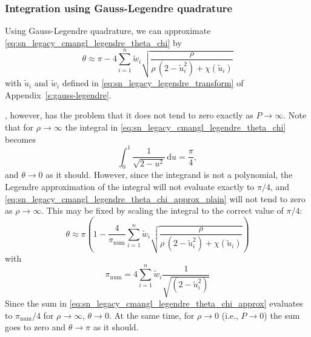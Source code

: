 \subsubsection{Integration using Gauss-Legendre quadrature}
%
Using Gauss-Legendre quadrature, we can approximate \cref{eq:sn_legacy_cmangl_legendre_theta_chi} by
%
\begin{equation}
    \label{eq:sn_legacy_cmangl_legendre_theta_chi_approx_plain}
    \theta \approx
        \pi - 4 \sum_{i=1}^n \tilde{w}_i
        \sqrt{ \frac{ \rho }{ \rho \, (2-\tilde{u}_i^2) + \chi(\tilde{u}_i) } }
\end{equation}
%
with \(\tilde{u}_i\) and \(\tilde{w}_i\) defined in \cref{eq:sn_legacy_legendre_transform} of Appendix~\ref{s:gauss-legendre}.

, however, has the problem that it does not tend to zero exactly as \(P \rightarrow \infty\).
Note that for \(\rho \rightarrow \infty\) the integral in \cref{eq:sn_legacy_cmangl_legendre_theta_chi} becomes
%
\begin{equation}
    \label{eq:sn_legacy_cmangl_legendre_pi}
    \int_0^1 \frac{ 1 }{ \sqrt{ 2-u^2 } } \, \mathrm{d}u = \frac{ \pi }{ 4 } ,
\end{equation}
%
and \(\theta \rightarrow 0\) as it should.
However, since the integrand is not a polynomial, the Legendre approximation of the integral will not evaluate exactly to \(\pi/4\), and \cref{eq:sn_legacy_cmangl_legendre_theta_chi_approx_plain} will not tend to zero as \(\rho \rightarrow \infty\).
This may be fixed by scaling the integral to the correct value of \(\pi/4\):
%
\begin{equation}
    \label{eq:sn_legacy_cmangl_legendre_theta_chi_approx}
    \theta \approx
        \pi \left( 1
        - \frac{ 4 }{ \pi_\mathrm{num} }
        \sum_{i=1}^n \tilde{w}_i \sqrt{
            \frac{ \rho
            }{ \rho \, (2-\tilde{u}_i^2) + \chi(\tilde{u}_i) } }
        \right)
\end{equation}
%
with
%
\begin{equation}
    \label{eq:sn_legacy_cmangl_legendre_pinum}
    \pi_\mathrm{num} =
        4 \sum_{i=1}^n \tilde{w}_i \frac{ 1 }{ \sqrt{ (2-\tilde{u}_i^2) } }
\end{equation}
%
Since the sum in \cref{eq:sn_legacy_cmangl_legendre_theta_chi_approx} evaluates to \(\pi_\mathrm{num}/4\) for \(\rho \rightarrow \infty\), \(\theta \rightarrow 0\).
At the same time, for \(\rho \rightarrow 0\) (i.e., \(P \rightarrow 0\)) the sum goes to zero and \(\theta \rightarrow \pi\) as it should.

